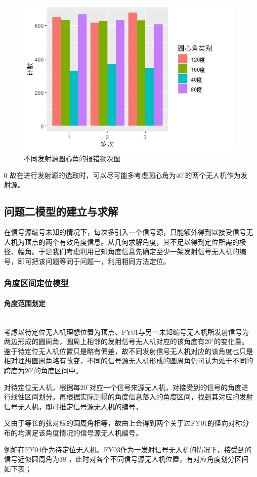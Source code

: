 \documentclass{ctexart}
\newcommand{\subsubsubsection}[1]{\paragraph{#1}\mbox{}\\}
\begin{document}
\begin{figure}[H]
  \centering
  \includegraphics[width=0.5\linewidth]{pic/Rplot01.jpeg}
  \caption{不同发射源圆心角的报错频次图}
  \label{不同发射源圆心角的报错频次图}
  \end{figure}



0
故在进行发射源的选取时，可以尽可能多考虑圆心角为$40^{\circ}$的两个无人机作为发射源。


\subsection{问题二模型的建立与求解}

在信号源编号未知的情况下，每次多引入一个信号源，只能额外得到以接受信号无人机为顶点的两个有效角度信息。从几何求解角度，其不足以得到定位所需的极径、幅角。于是我们考虑利用已知角度信息先确定至少一架发射信号无人机的编号，即可把该问题等同于问题一，利用相同方法定位。

\subsubsection{角度区间定位模型}

\subsubsubsection{角度范围划定}
考虑以待定位无人机理想位置为顶点、FY01与另一未知编号无人机所发射信号为两边形成的圆周角，圆周上相邻的发射信号无人机对应的该角度有$20^{\circ}$的变化量。鉴于待定位无人机位置只是略有偏差，故不同发射信号无人机对应的该角度也只是相对理想圆周角略有改变，不同的信号源无人机形成的圆周角仍可认为处于不同的跨度为$20^{\circ}$的角度区间中。

对待定位无人机，根据每$20^{\circ}$对应一个信号来源无人机，对接受到的信号的角度进行线性区间划分。再根据实际测得的角度信息落入的角度区间，找到其对应的发射信号无人机，即可推定信号源无人机的编号。

又由于等长的弦对应的圆周角相等，故由上会得到两个关于过FY01的径向对称分布的均满足该角度情况的信号源无人机编号。

例如在FY04作为待定位无人机、FY03作为一发射信号无人机的情况下，接受到的信号近似圆周角为$38^{\circ}$，此时对各个不同信号源无人机位置，有对应角度划分区间如下表；
\end{document}
